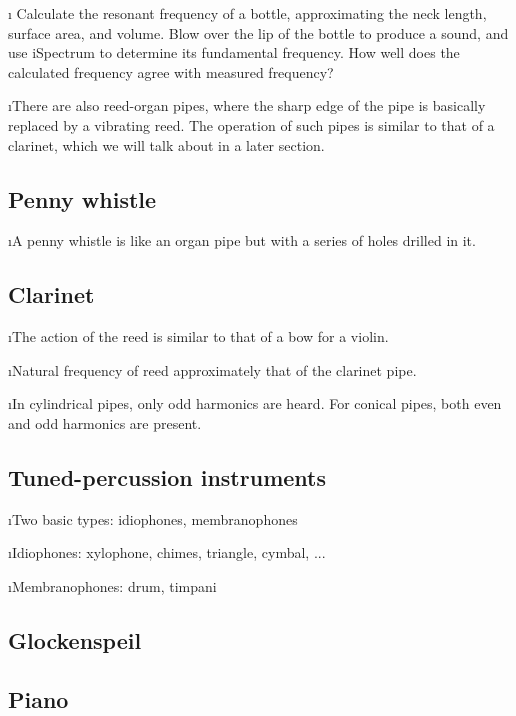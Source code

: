 \i \demo
Calculate the resonant frequency of a bottle,
approximating the neck length, surface area,
and volume.
Blow over the lip of the bottle to produce a sound, and
use iSpectrum to determine its fundamental frequency.
How well does the calculated frequency agree 
with measured frequency?

\i There are also reed-organ pipes, where
the sharp edge of the pipe is basically replaced 
by a vibrating reed.
The operation of such pipes is similar to 
that of a clarinet, which we will talk about 
in a later section.

\ei
\subsection{Penny whistle}
\bi

\i A penny whistle is like an organ pipe but with 
a series of holes drilled in it.

\ei
\subsection{Clarinet}
\bi

\i The action of the reed is similar to that of 
a bow for a violin.

\i Natural frequency of reed approximately that
of the clarinet pipe.

\i In cylindrical pipes, only odd harmonics are heard.
For conical pipes, both even and odd harmonics
are present.

\ei
\subsection{Tuned-percussion instruments}
\bi

\i Two basic types: idiophones, membranophones

\i Idiophones: xylophone, chimes, triangle, cymbal, ...

\i Membranophones: drum, timpani

\ei
\subsection{Glockenspeil}

\subsection{Piano}


